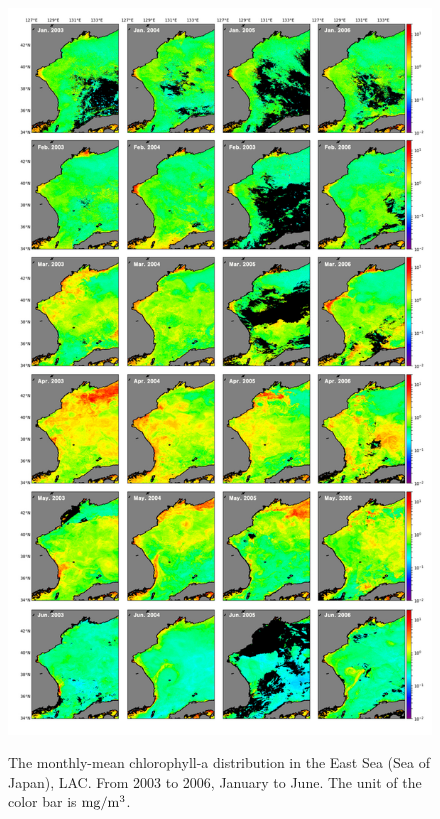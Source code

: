 \begin{figure}[t]
	\centering
	\includegraphics[width=0.8\linewidth]{../images/noname01}\\
	\caption{The monthly-mean chlorophyll-a distribution in the East Sea (Sea of Japan), LAC. From 2003 to 2006, January to June. The unit of the color bar is $\rm mg/m^3$.}
	\label{fig:noname01}
\end{figure}
 

